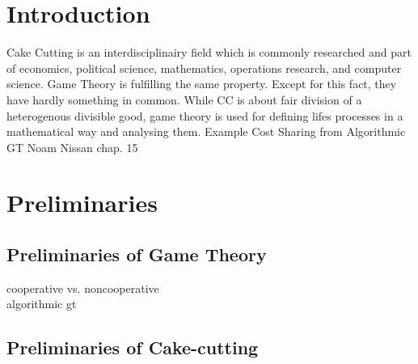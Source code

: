 


\section{Introduction}
Cake Cutting is an interdisciplinairy field which is commonly researched and part of economics, political science, mathematics, operations research, and computer science. Game Theory is fulfilling the same property. Except for this fact, they have hardly something in common. While CC is about fair division of a heterogenous divisible good, game theory is used for defining lifes processes in a mathematical way and analysing them.
Example Cost Sharing from Algorithmic GT Noam Nissan chap. 15
\pagebreak

\section{Preliminaries}
\subsection{Preliminaries of Game Theory}
cooperative vs. noncooperative\\
algorithmic gt

\newpage
\subsection{Preliminaries of Cake-cutting}
